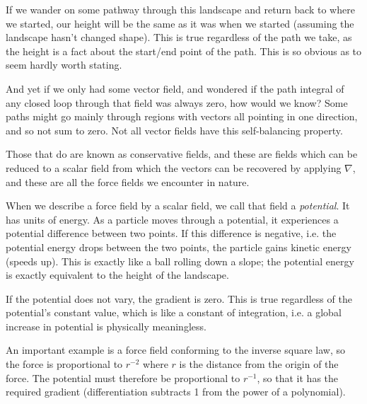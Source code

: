 If we wander on some pathway through this landscape and return back to where we started, our height will be the same as it was when we started (assuming the landscape hasn't changed shape). This is true regardless of the path we take, as the height is a fact about the start/end point of the path. This is so obvious as to seem hardly worth stating.

And yet if we only had some vector field, and wondered if the path integral of any closed loop through that field was always zero, how would we know? Some paths might go mainly through regions with vectors all pointing in one direction, and so not sum to zero. Not all vector fields have this self-balancing property.

Those that do are known as conservative fields, and these are fields which can be reduced to a scalar field from which the vectors can be recovered by applying $\nabla$, and these are all the force fields we encounter in nature.

When we describe a force field by a scalar field, we call that field a \textit{potential}. It has units of energy. As a particle moves through a potential, it experiences a potential difference between two points. If this difference is negative, i.e. the potential energy drops between the two points, the particle gains kinetic energy (speeds up). This is exactly like a ball rolling down a slope; the potential energy is exactly equivalent to the height of the landscape.

If the potential does not vary, the gradient is zero. This is true regardless of the potential's constant value, which is like a constant of integration, i.e. a global increase in potential is physically meaningless.

An important example is a force field conforming to the inverse square law, so the force is proportional to $r^{-2}$ where $r$ is the distance from the origin of the force. The potential must therefore be proportional to $r^{-1}$, so that it has the required gradient (differentiation subtracts 1 from the power of a polynomial).
